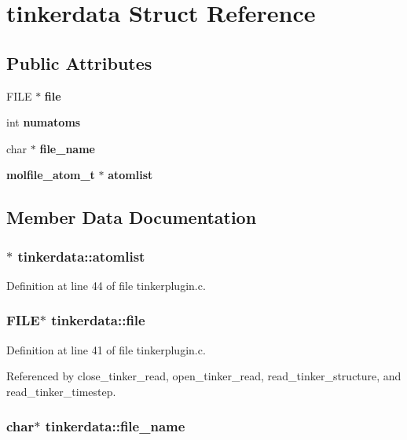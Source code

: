 \section{tinkerdata  Struct Reference}
\label{structtinkerdata}
\subsection*{Public Attributes}
\begin{CompactItemize}
\item 
FILE $\ast$ {\bf file}
\item 
int {\bf numatoms}
\item 
char $\ast$ {\bf file\_\-name}
\item 
{\bf molfile\_\-atom\_\-t} $\ast$ {\bf atomlist}
\end{CompactItemize}


\subsection{Member Data Documentation}
\subsubsection{$\ast$ tinkerdata::atomlist}\label{structtinkerdata_m3}




Definition at line 44 of file tinkerplugin.c.
\subsubsection{\setlength{\rightskip}{0pt plus 5cm}FILE$\ast$ tinkerdata::file}\label{structtinkerdata_m0}




Definition at line 41 of file tinkerplugin.c.

Referenced by close\_\-tinker\_\-read, open\_\-tinker\_\-read, read\_\-tinker\_\-structure, and read\_\-tinker\_\-timestep.
\subsubsection{\setlength{\rightskip}{0pt plus 5cm}char$\ast$ tinkerdata::file\_\-name}\label{structtinkerdata_m2}




